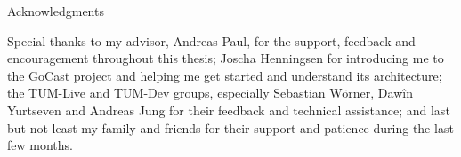 \thispagestyle{empty}

\vspace*{20mm}

\begin{center}
    { Acknowledgments}
\end{center}

\vspace{10mm}

\noindent Special thanks to my advisor, Andreas Paul, for the support, feedback and encouragement throughout this thesis; Joscha Henningsen for introducing me to the GoCast project and helping me get started and understand its architecture; the TUM-Live and TUM-Dev groups, especially Sebastian Wörner, Dawîn Yurtseven and Andreas Jung for their feedback and technical assistance; and last but not least my family and friends for their support and patience during the last few months.

\cleardoublepage{}
